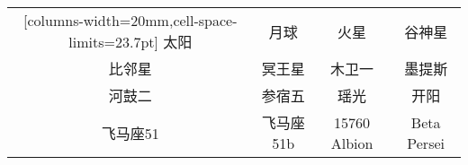\documentclass{standalone}
\begin{document}
\begin{NiceTabular}{*{4}{c}}[columns-width=20mm,cell-space-limits=23.7pt]
	太阳 & 月球 & 火星 & 谷神星 \\
	比邻星 & 冥王星 & 木卫一 & 墨提斯 \\
	河鼓二 & 参宿五 & 瑶光 & 开阳 \\
	飞马座51 & 飞马座51b & 15760 Albion & Beta Persei \\
\end{NiceTabular}
\end{document}
